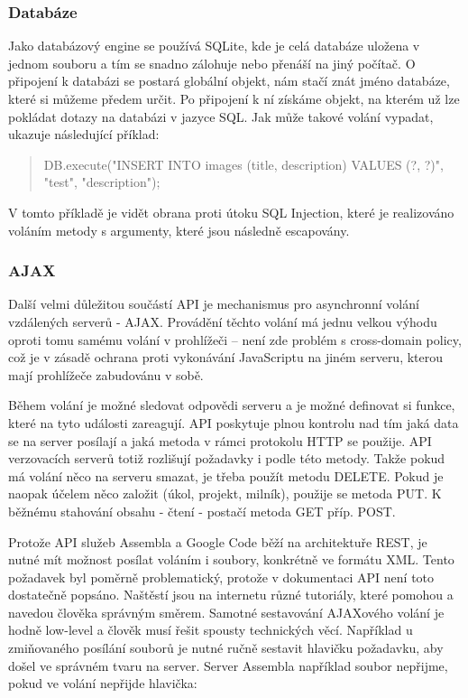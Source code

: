 \subsubsection{Databáze}

Jako databázový engine se používá SQLite, kde je celá databáze uložena v jednom souboru a tím se snadno zálohuje nebo přenáší na jiný počítač. O připojení k databázi se postará globální objekt, nám stačí znát jméno databáze, které si můžeme předem určit. Po připojení k ní získáme objekt, na kterém už lze pokládat dotazy na databázi v jazyce SQL. Jak může takové volání vypadat, ukazuje následující příklad:

\begin{quote}
DB.execute("INSERT INTO images (title, description) VALUES (?, ?)", "test", "description");
\end{quote}

V tomto příkladě je vidět obrana proti útoku SQL Injection, které je realizováno voláním metody s argumenty, které jsou následně escapovány.

\subsubsection{AJAX}

Další velmi důležitou součástí API je mechanismus pro asynchronní volání vzdálených serverů - AJAX. Provádění těchto volání má jednu velkou výhodu oproti tomu samému volání v prohlížeči – není zde problém s cross-domain policy, což je v zásadě ochrana proti vykonávání JavaScriptu na jiném serveru, kterou mají prohlížeče zabudovánu v sobě. 

Během volání je možné sledovat odpovědi serveru a je možné definovat si funkce, které na tyto události zareagují. API poskytuje plnou kontrolu nad tím jaká data se na server posílají a jaká metoda v rámci protokolu HTTP se použije. API verzovacích serverů totiž rozlišují požadavky i podle této metody. Takže pokud má volání něco na serveru smazat, je třeba použít metodu DELETE. Pokud je naopak účelem něco založit (úkol, projekt, milník), použije se metoda PUT. K běžnému stahování obsahu - čtení - postačí metoda GET příp. POST.

Protože API služeb Assembla a Google Code běží na architektuře REST, je nutné mít možnost posílat voláním i soubory, konkrétně ve formátu XML. Tento požadavek byl poměrně problematický, protože v dokumentaci API není toto dostatečně popsáno. Naštěstí jsou na internetu různé tutoriály, které pomohou a navedou člověka správným směrem. Samotné sestavování AJAXového volání je hodně low-level a člověk musí řešit spousty technických věcí. Například u zmiňovaného posílání souborů je nutné ručně sestavit hlavičku požadavku, aby došel ve správném tvaru na server. Server Assembla například soubor nepřijme, pokud ve volání nepřijde hlavička:

